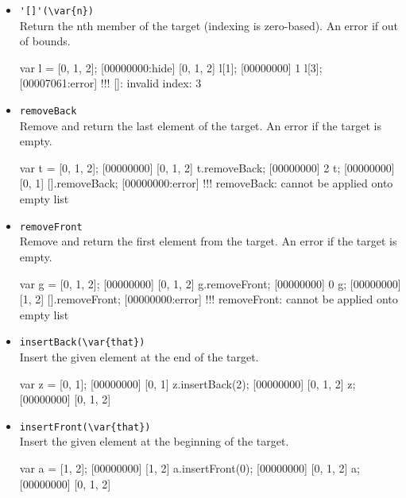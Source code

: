 \begin{itemize}
\item \lstinline|'[]'(\var{n})|\\
\label{sec:std-list-nth}
Return the nth member of the target (indexing is zero-based). An error
if out of bounds.

\begin{urbiscript}[firstnumber=last]
var l = [0, 1, 2];
[00000000:hide] [0, 1, 2]
l[1];
[00000000] 1
l[3];
[00007061:error] !!! []: invalid index: 3
\end{urbiscript}

\item \lstinline|removeBack|\\
Remove and return the last element of the target. An error if the
target is empty.

\begin{urbiscript}[firstnumber=last]
var t = [0, 1, 2];
[00000000] [0, 1, 2]
t.removeBack;
[00000000] 2
t;
[00000000] [0, 1]
[].removeBack;
[00000000:error] !!! removeBack: cannot be applied onto empty list
\end{urbiscript}

\item \lstinline|removeFront|\\
Remove and return the first element from the target. An error if the
target is empty.

\begin{urbiscript}[firstnumber=last]
var g = [0, 1, 2];
[00000000] [0, 1, 2]
g.removeFront;
[00000000] 0
g;
[00000000] [1, 2]
[].removeFront;
[00000000:error] !!! removeFront: cannot be applied onto empty list
\end{urbiscript}

\item \lstinline|insertBack(\var{that})|\\
\label{sec:std-list-pushback}
Insert the given element at the end of the target.

\begin{urbiscript}[firstnumber=last]
var z = [0, 1];
[00000000] [0, 1]
z.insertBack(2);
[00000000] [0, 1, 2]
z;
[00000000] [0, 1, 2]
\end{urbiscript}

\item \lstinline|insertFront(\var{that})|\\
Insert the given element at the beginning of the target.

\begin{urbiscript}[firstnumber=last]
var a = [1, 2];
[00000000] [1, 2]
a.insertFront(0);
[00000000] [0, 1, 2]
a;
[00000000] [0, 1, 2]
\end{urbiscript}


\end{itemize}
